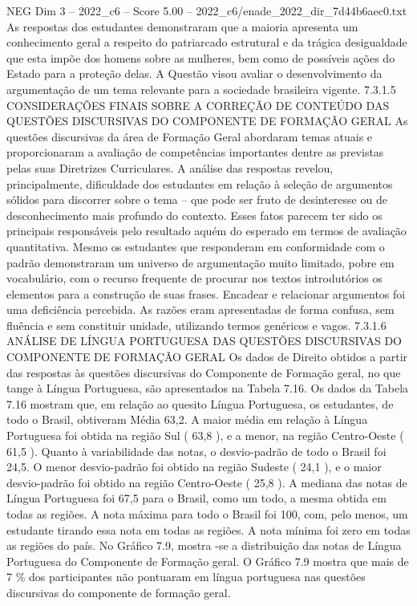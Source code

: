 \begin{textsample}{NEG Dim 3 – 2022\_c6 – Score 5.00 – 2022\_c6/enade\_2022\_dir\_7d44b6aec0.txt}
As respostas dos estudantes demonstraram que a maioria apresenta um conhecimento geral a respeito do patriarcado estrutural e da trágica desigualdade que esta impõe dos homens sobre as mulheres, bem como de possíveis ações do Estado para a proteção delas.
A Questão visou avaliar o desenvolvimento da argumentação de um tema relevante para a sociedade brasileira vigente. 7.3.1.5 CONSIDERAÇÕES FINAIS SOBRE A CORREÇÃO DE CONTEÚDO DAS QUESTÕES DISCURSIVAS DO COMPONENTE DE FORMAÇÃO GERAL As questões discursivas da área de Formação Geral abordaram temas atuais e proporcionaram a avaliação de competências importantes dentre as previstas pelas suas Diretrizes Curriculares.
A análise das respostas revelou, principalmente, dificuldade dos estudantes em relação à seleção de argumentos sólidos para discorrer sobre o tema – que pode ser fruto de desinteresse ou de desconhecimento mais profundo do contexto.
Esses fatos parecem ter sido os principais responsáveis pelo resultado aquém do esperado em termos de avaliação quantitativa.
Mesmo os estudantes que responderam em conformidade com o padrão demonstraram um universo de argumentação muito limitado, pobre em vocabulário, com o recurso frequente de procurar nos textos introdutórios os elementos para a construção de suas frases.
Encadear e relacionar argumentos foi uma deficiência percebida.
As razões eram apresentadas de forma confusa, sem fluência e sem constituir unidade, utilizando termos genéricos e vagos. 7.3.1.6 ANÁLISE DE LÍNGUA PORTUGUESA DAS QUESTÕES DISCURSIVAS DO COMPONENTE DE FORMAÇÃO GERAL Os dados de Direito obtidos a partir das respostas às questões discursivas do Componente de Formação geral, no que tange à Língua Portuguesa, são apresentados na Tabela 7.16.
Os dados da Tabela 7.16 mostram que, em relação ao quesito Língua Portuguesa, os estudantes, de todo o Brasil, obtiveram Média 63,2.
A maior média em relação à Língua Portuguesa foi obtida na região Sul ( 63,8 ), e a menor, na região Centro-Oeste ( 61,5 ).
Quanto à variabilidade das notas, o desvio-padrão de todo o Brasil foi 24,5.
O menor desvio-padrão foi obtido na região Sudeste ( 24,1 ), e o maior desvio-padrão foi obtido na região Centro-Oeste ( 25,8 ).
A mediana das notas de Língua Portuguesa foi 67,5 para o Brasil, como um todo, a mesma obtida em todas as regiões.
A nota máxima para todo o Brasil foi 100, com, pelo menos, um estudante tirando essa nota em todas as regiões.
A nota mínima foi zero em todas as regiões do país.
No Gráfico 7.9, mostra -se a distribuição das notas de Língua Portuguesa do Componente de Formação geral.
O Gráfico 7.9 mostra que mais de 7 \% dos participantes não pontuaram em língua portuguesa nas questões discursivas do componente de formação geral.

\end{textsample}
